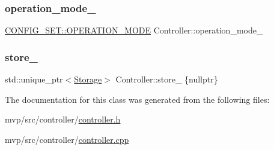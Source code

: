 \subsubsection{\texorpdfstring{operation\+\_\+mode\+\_\+}{operation\_mode\_}}
{\footnotesize\ttfamily \hyperlink{namespaceCONFIG__SET_ac5c2592b79bead7e6497c37cddc401e6}{C\+O\+N\+F\+I\+G\+\_\+\+S\+E\+T\+::\+O\+P\+E\+R\+A\+T\+I\+O\+N\+\_\+\+M\+O\+DE} Controller\+::operation\+\_\+mode\+\_\+\hspace{0.3cm}{\ttfamily [private]}}

\mbox{\label{classController_a0b119887316779a66a171650000304d4}} 
\subsubsection{\texorpdfstring{store\+\_\+}{store\_}}
{\footnotesize\ttfamily std\+::unique\+\_\+ptr$<$\hyperlink{classStorage}{Storage}$>$ Controller\+::store\+\_\+ \{nullptr\}\hspace{0.3cm}{\ttfamily [private]}}



The documentation for this class was generated from the following files\+:\begin{DoxyCompactItemize}
\item 
mvp/src/controller/\hyperlink{controller_8h}{controller.\+h}\item 
mvp/src/controller/\hyperlink{controller_8cpp}{controller.\+cpp}\end{DoxyCompactItemize}
